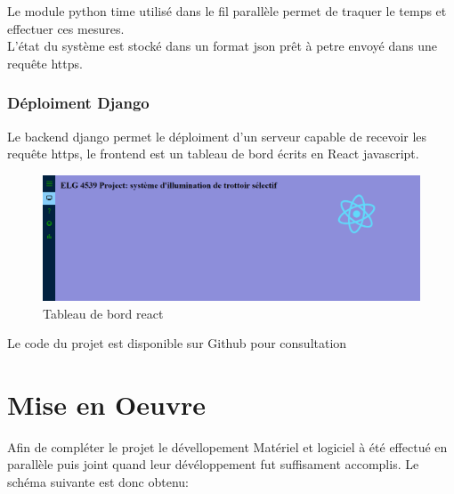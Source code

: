 \documentclass[journal]{IEEEtran}
\begin{document}
Le module python time utilisé dans le fil parallèle permet de traquer le temps et effectuer ces mesures.\\
L'état du système est stocké dans un format json prêt à petre envoyé dans une requête https.

\subsubsection{Déploiment Django}

Le backend django permet le déploiment d'un serveur capable de recevoir les requête https, le frontend est un tableau de bord écrits en React javascript.
\begin{figure}[htbp]
    \centerline{\includegraphics[scale = 0.18]{react_dashboard.PNG}}
    \caption{Tableau de bord react}
    \label{fig6}
\end{figure} 
Le code du projet est disponible sur Github pour consultation \cite{b6}
\\

\section{Mise en Oeuvre}
Afin de compléter le projet le dévellopement Matériel et logiciel à été effectué en parallèle puis joint quand leur dévéloppement fut suffisament accomplis. Le schéma suivante
est donc obtenu:
\end{document}
